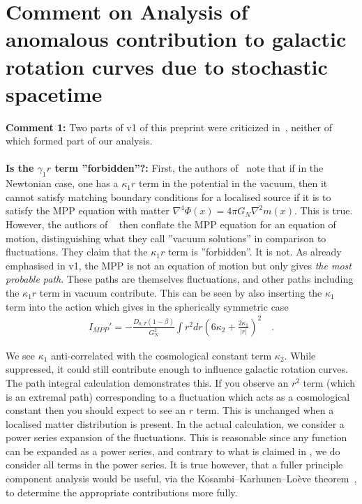 \documentclass[aps,pra,amsmath,amssymb,amsthm,floatfix,nofootinbib,notitlepage,superscriptaddress,10pt]{revtex4-2}
\begin{document}
\section{Comment on Analysis of anomalous contribution to galactic rotation curves due to stochastic spacetime}
\label{sec:comment}

{\bf\noindent Comment 1:} Two parts of v1 of this preprint were criticized in~\cite{hertzberg2024comment}, neither of which formed part of our analysis. 
\\\\
{\bf\noindent Is the $\gamma_1 r$ term ''forbidden''?:} First, the authors of~\cite{hertzberg2024comment} note that if in the Newtonian case, one has a $\kappa_1 r$ term in the potential in the vacuum, then it  cannot satisfy matching boundary conditions for a localised source if it is to satisfy the MPP equation with matter $\nabla^4\Phi(x)=4\pi G_N\nabla^2m(x)$. This is true. However, the authors of ~\cite{hertzberg2024comment} then conflate the MPP equation for an equation of motion, distinguishing what they call ''vacuum solutions'' in comparison to fluctuations. They claim that the $\kappa_1 r$ term is ''forbidden''. It is not. As already emphasised in v1, the MPP is not an equation of motion but only gives {\it the most probable path}. These paths are themselves fluctuations, and other paths including the $\kappa_1 r$ term in vacuum contribute. This can be seen by also inserting the $\kappa_1$ term into the action which gives in the spherically symmetric case
\begin{align}
	I_{MPP}'=-\frac{D_{0,T} (1-\beta)}{G_N^2}\int r^2 dr
	\left(6\kappa_2
	+\frac{2\kappa_1}{|r|}
	\right)^2\quad.
	\label{eq:NewtMPPaction2}
\end{align}

We see $\kappa_1$ anti-correlated with the cosmological constant term $\kappa_2$. While suppressed, it could still contribute enough to influence galactic rotation curves.
The path integral calculation demonstrates this. If you observe an $r^2$ term (which is an extremal path) corresponding to a fluctuation which acts as a cosmological constant then you should expect to see an $r$ term.  This is unchanged when a localised matter distribution is present. In the actual calculation, we consider a power series expansion of the fluctuations. This is reasonable since any function can be expanded as a power series, and contrary to what is claimed in \cite{hertzberg2024comment}, we do consider all terms in the power series. It is true however, that a fuller principle component analysis would be useful, via the Kosambi–Karhunen–Loève theorem~\cite{Love1978}, to determine the appropriate contributions more fully. 
\end{document}
